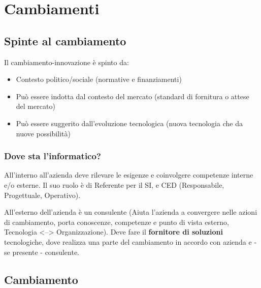 \chapter{Cambiamenti}

\section{Spinte al cambiamento}

Il cambiamento-innovazione è spinto da:

\begin{itemize}
  \item
    Contesto politico/sociale (normative e finanziamenti)
  \item
    Può essere indotta dal contesto del mercato (standard di fornitura o attese
    del mercato)
  \item
    Può essere suggerito dall'evoluzione tecnologica (nuova tecnologia che da 
    nuove possibilità)
\end{itemize} 


\subsection{Dove sta l'informatico?}

All'interno all'azienda deve rilevare le esigenze e coinvolgere competenze 
interne e/o esterne. Il suo ruolo è di Referente per il SI, e CED 
(Responsabile, Progettuale, Operativo).

All'esterno dell'azienda è un consulente (Aiuta l'azienda a convergere nelle 
azioni di cambiamento, porta conoscenze, competenze e punto di vista esterno, 
Tecnologia <--> Organizzazione). Deve fare il \textbf{fornitore di soluzioni} 
tecnologiche, dove realizza una parte del cambiamento in accordo con azienda 
e - se presente - consulente.

\section{Cambiamento}
  
